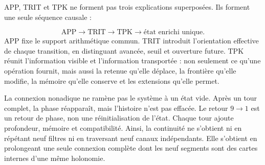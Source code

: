 APP, TRIT et TPK ne forment pas trois explications superposées. Ils forment une seule séquence causale :\par
\[
\mathrm{APP}
\longrightarrow
\mathrm{TRIT}
\longrightarrow
\mathrm{TPK}
\longrightarrow
\text{état enrichi unique}.
\]
APP fixe le support arithmétique commun. TRIT introduit l’orientation effective de chaque transition, en distinguant avancée, seuil et ouverture future. TPK réunit l’information visible et l’information transportée : non seulement ce qu’une opération fournit, mais aussi la retenue qu’elle déplace, la frontière qu’elle modifie, la mémoire qu’elle conserve et les extensions qu’elle permet.\par
La connexion nonadique ne ramène pas le système à un état vide. Après un tour complet, la phase réapparaît, mais l’histoire n’est pas effacée. Le retour \(9\to1\) est un retour de phase, non une réinitialisation de l’état. Chaque tour ajoute profondeur, mémoire et compatibilité. Ainsi, la continuité ne s’obtient ni en répétant neuf filtres ni en traversant neuf canaux indépendants. Elle s’obtient en prolongeant une seule connexion complète dont les neuf segments sont des cartes internes d’une même holonomie.\par
{}
